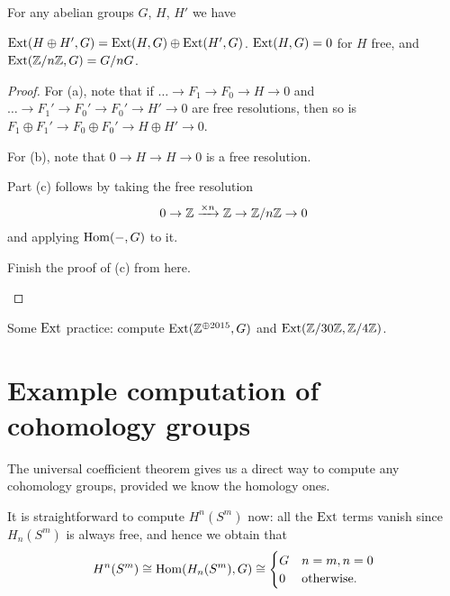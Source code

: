 \begin{lemma}
	For any abelian groups $G$, $H$, $H'$ we have
	\begin{enumerate}[(a)]
		\ii $\operatorname{Ext}(H \oplus H', G) = \operatorname{Ext}(H, G) \oplus \operatorname{Ext}(H', G)$.
		\ii $\operatorname{Ext}(H,G) = 0$ for $H$ free, and
		\ii $\operatorname{Ext}(\mathbb Z/n\mathbb Z, G) = G / nG$.
	\end{enumerate}
\end{lemma}
\begin{proof}
	For (a), note that if $\dots \to F_1 \to F_0 \to H \to 0$
	and $\dots \to F_1' \to F_0' \to F_0' \to H' \to 0$ are free resolutions,
	then so is $F_1 \oplus F_1' \to F_0 \oplus F_0' \to H \oplus H' \to 0$.

	For (b), note that $0 \to H \to H \to 0$ is a free resolution.
	
	Part (c) follows by taking the free resolution
	\[ 0 \to \mathbb Z \xrightarrow{\times n} \mathbb Z \to \mathbb Z/n\mathbb Z \to 0 \]
	and applying $\operatorname{Hom}(-,G)$ to it.
	\begin{ques}
		Finish the proof of (c) from here. \qedhere
	\end{ques}
\end{proof}

\begin{ques}
	Some $\operatorname{Ext}$ practice: compute
	$\operatorname{Ext}(\mathbb Z^{\oplus 2015}, G)$ and $\operatorname{Ext}(\mathbb Z/30\mathbb Z, \mathbb Z/4\mathbb Z)$.
\end{ques}

\section{Example computation of cohomology groups}

The universal coefficient theorem gives us a direct way to compute
any cohomology groups, provided we know the homology ones.

\begin{example}
	It is straightforward to compute $H^n(S^m)$ now:
	all the $\operatorname{Ext}$ terms vanish since $H_n(S^m)$ is always free,
	and hence we obtain that 
	\[ H^n(S^m) \cong \operatorname{Hom}(H_n(S^m), G) \cong
		\begin{cases}
			G & n=m, n=0 \\
			0 & \text{otherwise}.
		\end{cases}
	\]
\end{example}


